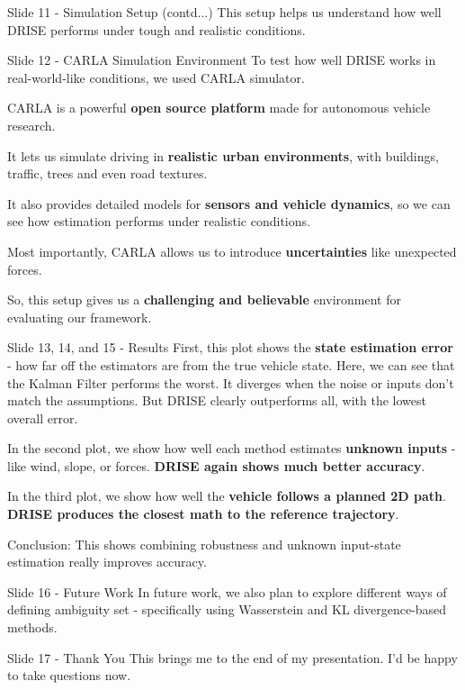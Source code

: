 \documentclass{beamer}
\begin{document}
\begin{frame}{Slide 11 - Simulation Setup (contd...)}
This setup helps us understand how well DRISE performs under tough and
realistic conditions.
\end{frame}

\begin{frame}{Slide 12 - CARLA Simulation Environment}
\protect\hypertarget{slide-12---carla-simulation-environment}{}
To test how well DRISE works in real-world-like conditions, we used
CARLA simulator.

CARLA is a powerful \textbf{open source platform} made for autonomous
vehicle research.

It lets us simulate driving in \textbf{realistic urban environments},
with buildings, traffic, trees and even road textures.

It also provides detailed models for \textbf{sensors and vehicle
dynamics}, so we can see how estimation performs under realistic
conditions.

Most importantly, CARLA allows us to introduce \textbf{uncertainties}
like unexpected forces.

So, this setup gives us a \textbf{challenging and believable}
environment for evaluating our framework.
\end{frame}

\begin{frame}{Slide 13, 14, and 15 - Results}
\protect\hypertarget{slide-13-14-and-15---results}{}
First, this plot shows the \textbf{state estimation error} - how far off
the estimators are from the true vehicle state. Here, we can see that
the Kalman Filter performs the worst. It diverges when the noise or
inputs don't match the assumptions. But DRISE clearly outperforms all,
with the lowest overall error.

In the second plot, we show how well each method estimates
\textbf{unknown inputs} - like wind, slope, or forces. \textbf{DRISE
again shows much better accuracy}.

In the third plot, we show how well the \textbf{vehicle follows a
planned 2D path}. \textbf{DRISE produces the closest math to the
reference trajectory}.

Conclusion: This shows combining robustness and unknown input-state
estimation really improves accuracy.
\end{frame}

\begin{frame}{Slide 16 - Future Work}
\protect\hypertarget{slide-16---future-work}{}
In future work, we also plan to explore different ways of defining
ambiguity set - specifically using Wasserstein and KL divergence-based
methods.
\end{frame}

\begin{frame}{Slide 17 - Thank You}
\protect\hypertarget{slide-17---thank-you}{}
This brings me to the end of my presentation. I'd be happy to take
questions now.
\end{frame}
\end{document}
